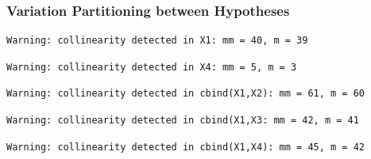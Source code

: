 \documentclass[
  letterpaper,
  DIV=11,
  numbers=noendperiod]{scrartcl}
\newenvironment{Shaded}{\begin{snugshade}}{\end{snugshade}}
\newcommand{\CommentTok}[1]{\textcolor[rgb]{0.37,0.37,0.37}{#1}}
\newcommand{\FunctionTok}[1]{\textcolor[rgb]{0.28,0.35,0.67}{#1}}
\newcommand{\NormalTok}[1]{\textcolor[rgb]{0.00,0.23,0.31}{#1}}
\newcommand{\OtherTok}[1]{\textcolor[rgb]{0.00,0.23,0.31}{#1}}
\newcommand{\SpecialCharTok}[1]{\textcolor[rgb]{0.37,0.37,0.37}{#1}}
\begin{document}
\subsubsection{Variation Partitioning between
Hypotheses}\label{variation-partitioning-between-hypotheses}

\begin{Shaded}
\end{Shaded}

\begin{verbatim}
Warning: collinearity detected in X1: mm = 40, m = 39
\end{verbatim}

\begin{verbatim}
Warning: collinearity detected in X4: mm = 5, m = 3
\end{verbatim}

\begin{verbatim}
Warning: collinearity detected in cbind(X1,X2): mm = 61, m = 60
\end{verbatim}

\begin{verbatim}
Warning: collinearity detected in cbind(X1,X3: mm = 42, m = 41
\end{verbatim}

\begin{verbatim}
Warning: collinearity detected in cbind(X1,X4): mm = 45, m = 42
\end{verbatim}
\end{document}
